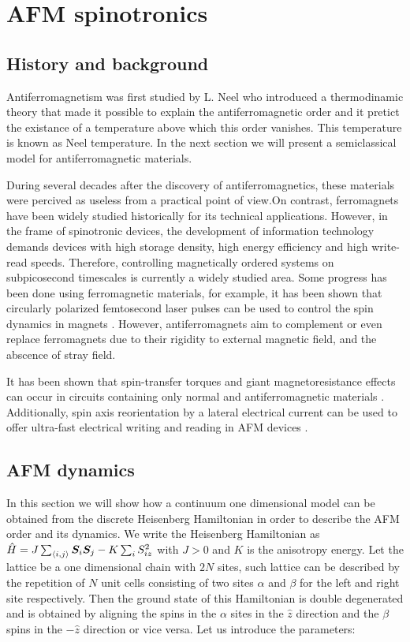 \chapter{AFM spinotronics}

\section{History and background}

Antiferromagnetism was first studied by L. Neel who introduced a thermodinamic theory that made it possible to explain the antiferromagnetic order and it pretict the existance of a temperature above which this order vanishes. This temperature is known as Neel temperature. In the next section we will present a semiclassical model for antiferromagnetic materials.

During several decades after the discovery of antiferromagnetics, these materials were percived as useless from a practical point of view.On contrast, ferromagnets have been widely studied historically for its technical applications. However, in the frame of spinotronic devices, the development of information technology demands devices with high storage density, high energy efficiency and high write-read speeds. Therefore, controlling magnetically ordered systems on subpicosecond timescales is currently a widely studied area. Some progress has been done using ferromagnetic materials, for example, it has been shown that circularly polarized femtosecond laser pulses can be used to control the spin dynamics in magnets \cite{Kimel2005}. However, antiferromagnets aim to complement or even replace ferromagnets due to their rigidity to external magnetic field, and the abscence of stray field.

It has been shown that spin-transfer torques and giant magnetoresistance effects can occur in circuits containing only normal and antiferromagnetic materials \cite{MacDonald2011}. Additionally, spin axis reorientation by a lateral electrical current can be used to offer ultra-fast electrical writing and reading in AFM devices \cite{Zelezny2014}.

\section{AFM dynamics}

In this section we will show how a continuum one dimensional model can be obtained from the discrete Heisenberg Hamiltonian in order to describe the AFM order and its dynamics. We write the Heisenberg Hamiltonian as $\hat{H} = J \sum_{\langle i,j \rangle} \boldsymbol{S}_i\boldsymbol{S}_j - K \sum_i S_{iz}^2$ with $J>0$ and $K$ is the anisotropy energy. Let the lattice be a one dimensional chain with $2N$ sites, such lattice can be described by the repetition of $N$ unit cells consisting of two sites $\alpha$ and $\beta$ for the left and right site respectively. Then the ground state of this Hamiltonian is double degenerated and is obtained by aligning the spins in the $\alpha$ sites in the $\hat{z}$ direction and the $\beta$ spins in the $-\hat{z}$ direction or vice versa. Let us introduce the parameters:

